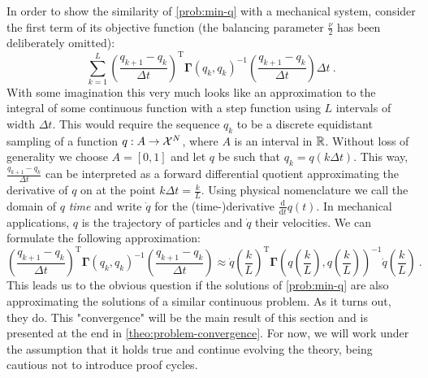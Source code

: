 In order to show the similarity of \cref{prob:min-q} with a mechanical system, consider the first term of its objective function (the balancing parameter $\frac{\nu}{2}$ has been deliberately omitted):
\begin{equation}
	\label{eq:discrete-lagrangian}
	\sum_{k=1}^{L} \left(\frac{q_{k+1} - q_k}{\Delta t}\right)^\mathrm{T} \mathbf{\Gamma}(q_k, q_k)^{-1} \left(\frac{q_{k+1} - q_k}{\Delta t}\right) \Delta t \ .
\end{equation}
With some imagination this very much looks like an approximation to the integral of some continuous function with a step function using $L$ intervals of width $\Delta t$.
This would require the sequence $q_k$ to be a discrete equidistant sampling of a function $q: A \rightarrow \mathcal{X}^N$, where $A$ is an interval in $\mathbb{R}$.
Without loss of generality we choose $A = [0, 1]$ and let $q$ be such that $q_k = q(k \Delta t)$.
This way, $\frac{q_{k+1} - q_k}{\Delta t}$ can be interpreted as a forward differential quotient approximating the derivative of $q$ on at the point $k \Delta t = \frac{k}{L}$.
Using physical nomenclature we call the domain of $q$ \emph{time} and write $\dot{q}$ for the (time-)derivative $\frac{\mathrm{d}}{\mathrm{d}t}q(t)$.
In mechanical applications, $q$ is the trajectory of particles and $\dot{q}$ their velocities.
We can formulate the following approximation:
\begin{equation}
	\left(\frac{q_{k+1} - q_k}{\Delta t}\right)^\mathrm{T} \mathbf{\Gamma}(q_k, q_k)^{-1} \left(\frac{q_{k+1} - q_k}{\Delta t}\right)
	\approx \dot{q}\left(\frac{k}{L}\right)^\mathrm{T} \mathbf{\Gamma}\left(q\left(\frac{k}{L}\right), q\left(\frac{k}{L}\right)\right)^{-1}\dot{q}\left(\frac{k}{L}\right) \ .
\end{equation}
This leads us to the obvious question if the solutions of \cref{prob:min-q} are also approximating the solutions of a similar continuous problem.
As it turns out, they do.
This "convergence" will be the main result of this section and is presented at the end in \cref{theo:problem-convergence}.
For now, we will work under the assumption that it holds true and continue evolving the theory, being cautious not to introduce proof cycles.


